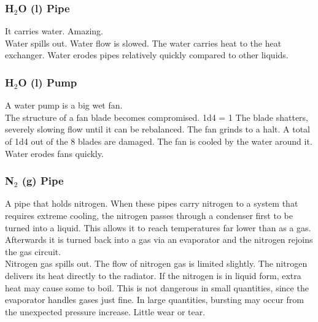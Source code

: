 \documentclass[a4paper]{article}
\begin{document}
\vspace{-0.5cm} \hspace{-18pt} \subsubsection{H$_2$O (l) Pipe} \label{thermal_h2o_pipe} \vspace{-0.2cm}
It carries water. Amazing.
\\ \pbhw
{Water spills out.}
{Water flow is slowed.}
{The water carries heat to the heat exchanger.}
{Water erodes pipes relatively quickly compared to other liquids.}


\vspace{-0.5cm} \hspace{-18pt} \subsubsection{H$_2$O (l) Pump} \label{thermal_h2o_pump} \vspace{-0.2cm}
A water pump is a big wet fan.
\\ \pbhw
{The structure of a fan blade becomes compromised. \newline 1d4 = 1 The blade shatters, severely slowing flow until it can be rebalanced.}
{The fan grinds to a halt. A total of 1d4 out of the 8 blades are damaged.}
{The fan is cooled by the water around it.}
{Water erodes fans quickly.}


\vspace{-0.5cm} \hspace{-18pt} \subsubsection{N$_2$ (g) Pipe} \label{thermal_n2_pipe} \vspace{-0.2cm}
A pipe that holds nitrogen. When these pipes carry nitrogen to a system that requires extreme cooling, the nitrogen passes through a condenser first to be turned into a liquid. This allows it to reach temperatures far lower than as a gas. Afterwards it is turned back into a gas via an evaporator and the nitrogen rejoins the gas circuit.
\\ \pbhw
{Nitrogen gas spills out.  }
{The flow of nitrogen gas is limited slightly.}
{The nitrogen delivers its heat directly to the radiator. If the nitrogen is in liquid form, extra heat may cause some to boil. This is not dangerous in small quantities, since the evaporator handles gases just fine. In large quantities, bursting may occur from the unexpected pressure increase.}
{Little wear or tear.}
\end{document}
